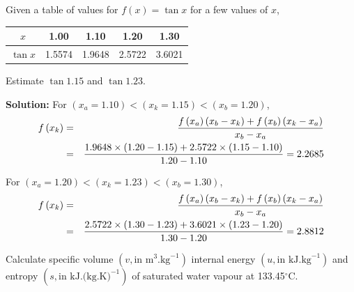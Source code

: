     \begin{list}{\bf Example :~}{}
%       
         \item Given a table of values for $f(x)=\tan{x}$ for a few values of $x$,
            \begin{center}
               \begin{tabular}{c | c c c c}
                   $x$        & 1.00   & 1.10   & 1.20   & 1.30   \\
                   \hline
                   $\tan{x}$  & 1.5574 & 1.9648 & 2.5722 & 3.6021 \\
               \end{tabular}
            \end{center}
            Estimate $\tan{1.15}$ and $\tan{1.23}$.

            {\bf Solution:} For $\left(x_{a}=1.10\right) < \left(x_{k}=1.15\right) < \left(x_{b}=1.20\right)$,
               \begin{eqnarray}
                  f\left(x_{k}\right) &=& \displaystyle\frac{f\left(x_{a}\right)\left(x_{b}-x_{k}\right) + f\left(x_{b}\right)\left(x_{k}-x_{a}\right)}{x_{b}-x_{a}} \nonumber \\
                                     &=& \displaystyle\frac{1.9648\times(1.20-1.15) + 2.5722\times(1.15-1.10)}{1.20-1.10} = 2.2685 \nonumber
               \end{eqnarray}

For  $\left(x_{a}=1.20\right) < \left(x_{k}=1.23\right) < \left(x_{b}=1.30\right)$,
               \begin{eqnarray}
                  f\left(x_{k}\right) &=& \displaystyle\frac{f\left(x_{a}\right)\left(x_{b}-x_{k}\right) + f\left(x_{b}\right)\left(x_{k}-x_{a}\right)}{x_{b}-x_{a}} \nonumber \\
                                     &=& \displaystyle\frac{2.5722\times(1.30-1.23) + 3.6021\times(1.23-1.20)}{1.30-1.20} = 2.8812 \nonumber
               \end{eqnarray}
%
         \item Calculate specific volume $\left(v, \text{in m}^{3}\text{.kg}^{-1}\right)$ internal energy $\left(u, \text{in kJ.kg}^{-1}\right)$ and entropy $\left(s, \text{in kJ.(kg.K)}^{-1}\right)$ of saturated water vapour at 133.45$^{\circ}$C.


\end{list}
